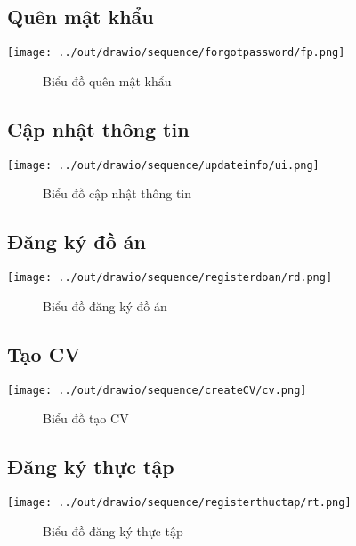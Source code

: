   \subsection*{Quên mật khẩu}
    \begin{center}
      \texttt{[image: ../out/drawio/sequence/forgotpassword/fp.png]}
      \begin{figure}[h]
        \centering
        \caption{Biểu đồ quên mật khẩu}
      \end{figure}
    \end{center}

  \subsection*{Cập nhật thông tin}
    \begin{center}
      \texttt{[image: ../out/drawio/sequence/updateinfo/ui.png]}
      \begin{figure}[h]
        \centering
        \caption{Biểu đồ cập nhật thông tin}
      \end{figure}
    \end{center}

  \subsection*{Đăng ký đồ án}
    \begin{center}
      \texttt{[image: ../out/drawio/sequence/registerdoan/rd.png]}
      \begin{figure}[h]
        \centering
        \caption{Biểu đồ đăng ký đồ án}
      \end{figure}
    \end{center}

  \subsection*{Tạo CV}
    \begin{center}
      \texttt{[image: ../out/drawio/sequence/createCV/cv.png]}
      \begin{figure}[h]
        \centering
        \caption{Biểu đồ tạo CV}
      \end{figure}
    \end{center}

  \subsection*{Đăng ký thực tập}
    \begin{center}
      \texttt{[image: ../out/drawio/sequence/registerthuctap/rt.png]}
      \begin{figure}[h]
        \centering
        \caption{Biểu đồ đăng ký thực tập}
      \end{figure}
    \end{center}

